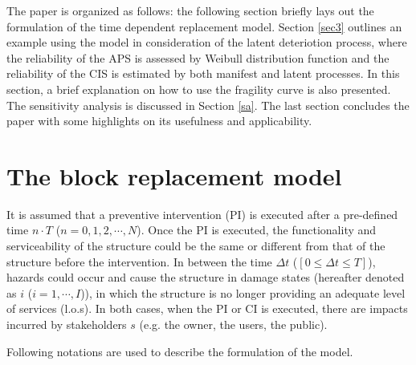 \documentclass[fleqn]{article}
\begin{document}
The paper is organized as follows: the following section briefly lays out the formulation of the time dependent replacement model. Section \ref{sec3} outlines an example using the model in consideration of the latent deteriotion process, where the reliability of the APS is assessed by Weibull distribution function and the reliability of the CIS is estimated by both manifest and latent processes. In this section, a brief explanation on how to use the fragility curve is also presented. The sensitivity analysis is discussed in Section \ref{sa}. The last section concludes the paper with some highlights on its usefulness and applicability.
%
\section{The block replacement model} \label{sec2}
It is assumed that a preventive intervention (PI) is executed after a pre-defined time $n\cdot T$ ($n=0,1,2,\cdots,N$). Once the PI is executed, the functionality and serviceability of the structure could be the same or different from that of the structure before the intervention. In between the time $\Delta t$ ($[0\le \Delta t \le T]$), hazards could occur and cause the structure in damage states (hereafter denoted as $i$ ($i=1,\cdots,I$)), in which the structure is no longer providing an adequate level of services (l.o.s). In both cases, when the PI or CI is executed, there are impacts incurred by stakeholders $s$ (e.g. the owner, the users, the public).

Following notations are used to describe the formulation of the model.
\end{document}
